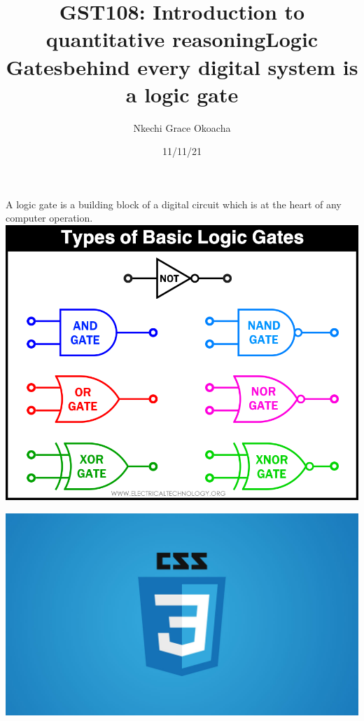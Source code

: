 \documentclass{article}
\begin{document}
	\newpage
	
	\title{GST108: Introduction to quantitative reasoning}
	\author{Nkechi Grace Okoacha}
	\date{11/11/21}
	\maketitle
	
	\newpage
	\title{Logic Gates}
	\maketitle
	A logic gate is a building block of a digital circuit which is at the heart of any computer operation.
	\newline
	\includegraphics[width=\linewidth]{logicgates.png}
	
	\newpage
	
	\title{behind every digital system is a logic gate}
	\includegraphics{css.jpg}
	
	\newpage
	
	\
\end{document}

